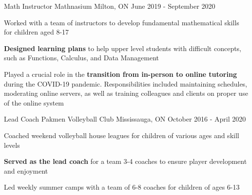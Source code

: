 
\begin{cventries}
  \cventry
    {Math Instructor} %
    {Mathnasium} %
    {Milton, ON} %
    {June 2019 - September 2020} %
    {
      \begin{cvitems} %
        \item {Worked with a team of instructors to develop fundamental mathematical skills for children aged 8-17}
        \item {\textbf{Designed learning plans} to help upper level students with difficult concepts, such as Functions, Calculus, and Data Management}
        \item {Played a crucial role in the \textbf{transition from in-person to online tutoring} during the COVID-19 pandemic. Responsibilities included maintaining schedules, moderating online servers, as well as training colleagues and clients on proper use of the online system}
      \end{cvitems}
    }

  \cventry
    {Lead Coach} %
    {Pakmen Volleyball Club} %
    {Mississauga, ON} %
    {October 2016 - April 2020} %
    {
      \begin{cvitems} %
        \item {Coached weekend volleyball house leagues for children of various ages and skill levels}
        \item {\textbf{Served as the lead coach} for a team 3-4 coaches to ensure player development and enjoyment}
        \item {Led weekly summer camps with a team of 6-8 coaches for children of ages 6-13}
      \end{cvitems}
    }

   
\end{cventries}
